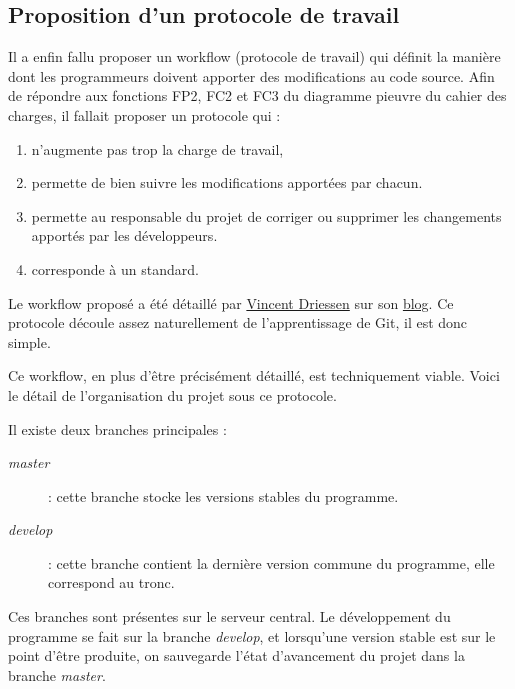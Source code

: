 \subsection{Proposition d'un protocole de travail}
Il a enfin fallu proposer un workflow (protocole de travail) 
qui définit la manière dont les programmeurs
doivent apporter des modifications au code source.
Afin de répondre aux fonctions FP2, FC2 et FC3 du diagramme pieuvre du cahier des charges, il fallait proposer un protocole qui :
\begin{enumerate}
  \item n'augmente pas trop la charge de travail,
  \item permette de bien suivre les modifications apportées par chacun. 
  \item permette au responsable du projet de corriger ou supprimer les changements apportés par les développeurs.
  \item corresponde à un standard.
\end{enumerate}

Le workflow proposé a été détaillé par \href{http://nvie.com/about }{Vincent Driessen} sur son \href{http://nvie.com/Git-model}{blog}.
Ce protocole découle assez naturellement de l'apprentissage de Git, il est donc simple.


Ce workflow, en plus d'être précisément détaillé, est techniquement viable. 
Voici le détail de l'organisation du projet {\gofigure} sous ce protocole.

Il existe deux branches principales : 
\begin{description}
  \item[\emph{master}] : cette branche stocke les versions stables du programme.
  \item[\emph{develop}] : cette branche contient la dernière version commune du programme, elle correspond au tronc.
\end{description}
Ces branches sont présentes sur le serveur central. Le développement du programme se fait sur la branche \emph{develop}, et lorsqu'une version stable est sur le point d'être produite, on sauvegarde l'état d'avancement du projet dans la branche \emph{master}.

